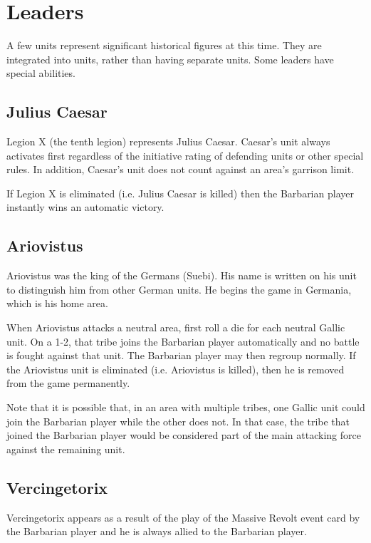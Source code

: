 \section{Leaders}
\par
A few units represent significant historical figures at this time. They are integrated into units, rather than having separate units. Some leaders have special abilities.

\subsection{Julius Caesar}
\par
Legion X (the tenth legion) represents Julius Caesar. Caesar’s unit always activates first regardless of the initiative rating of defending units or other special rules. In addition, Caesar’s unit does not count against an area’s garrison limit.

If Legion X is eliminated (i.e. Julius Caesar is killed) then the Barbarian player instantly wins an automatic victory.

\subsection{Ariovistus}
\par
Ariovistus was the king of the Germans (Suebi). His name is written on his unit to distinguish him from other German units. He begins the game in Germania, which is his home area.

When Ariovistus attacks a neutral area, first roll a die for each neutral Gallic unit. On a 1-2, that tribe joins the Barbarian player automatically and no battle is fought against that unit. The Barbarian player may then regroup normally. If the Ariovistus unit is eliminated (i.e. Ariovistus is killed), then he is removed from the game permanently.

Note that it is possible that, in an area with multiple tribes, one Gallic unit could join the Barbarian player while the other does not. In that case, the tribe that joined the Barbarian player would be considered part of the main attacking force against the remaining unit.

\subsection{Vercingetorix}
\par
Vercingetorix appears as a result of the play of the Massive Revolt event card by the Barbarian player and he is always allied to the Barbarian player.

